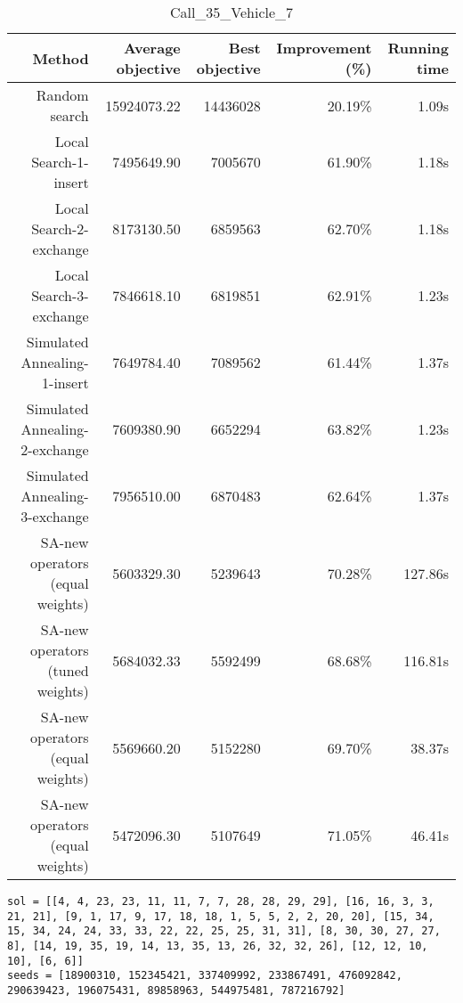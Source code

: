 \begin{table}[ht]
\centering
\caption{Call\_35\_Vehicle\_7}
\label{tab:call35vehicle7}
\begin{tabular}{|r|r|r|r|r|}
Method & Average objective & Best objective & Improvement (\%) & Running time \\
\hline
Random search & 15924073.22 & 14436028 & 20.19\% & 1.09s\\
Local Search-1-insert & 7495649.90 & 7005670 & 61.90\% & 1.18s\\
Local Search-2-exchange & 8173130.50 & 6859563 & 62.70\% & 1.18s\\
Local Search-3-exchange & 7846618.10 & 6819851 & 62.91\% & 1.23s\\
Simulated Annealing-1-insert & 7649784.40 & 7089562 & 61.44\% & 1.37s\\
Simulated Annealing-2-exchange & 7609380.90 & 6652294 & 63.82\% & 1.23s\\
Simulated Annealing-3-exchange & 7956510.00 & 6870483 & 62.64\% & 1.37s\\
SA-new operators (equal weights) & 5603329.30 & 5239643 & 70.28\% & 127.86s\\
SA-new operators (tuned weights) & 5684032.33 & 5592499 & 68.68\% & 116.81s\\
SA-new operators (equal weights) & 5569660.20 & 5152280 & 69.70\% & 38.37s\\
SA-new operators (equal weights) & 5472096.30 & 5107649 & 71.05\% & 46.41s\\
\end{tabular}%
\end{table}
\begin{lstlisting}[label={lst:call35vehicle7},caption=Optimal solution call\_35\_vehicle\_7]
sol = [[4, 4, 23, 23, 11, 11, 7, 7, 28, 28, 29, 29], [16, 16, 3, 3, 21, 21], [9, 1, 17, 9, 17, 18, 18, 1, 5, 5, 2, 2, 20, 20], [15, 34, 15, 34, 24, 24, 33, 33, 22, 22, 25, 25, 31, 31], [8, 30, 30, 27, 27, 8], [14, 19, 35, 19, 14, 13, 35, 13, 26, 32, 32, 26], [12, 12, 10, 10], [6, 6]]
seeds = [18900310, 152345421, 337409992, 233867491, 476092842, 290639423, 196075431, 89858963, 544975481, 787216792]
\end{lstlisting}%
\clearpage


